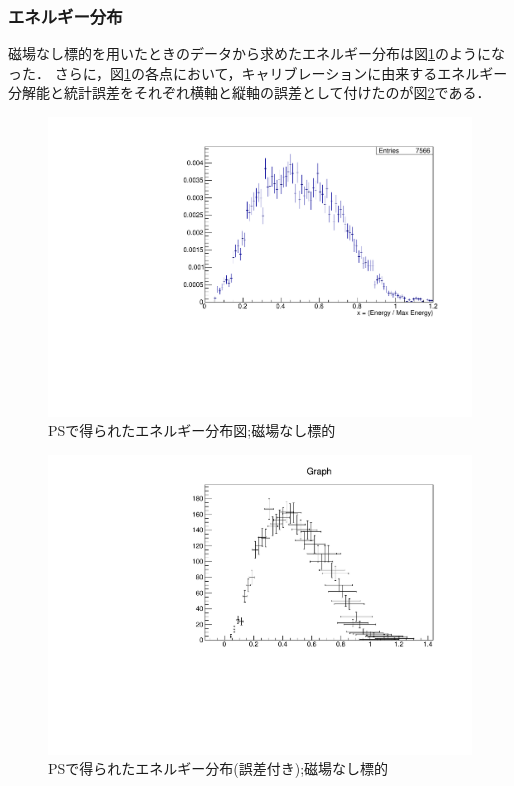 \subsubsection{エネルギー分布}
磁場なし標的を用いたときのデータから求めたエネルギー分布は図\ref{michel_PS}のようになった．
さらに，図\ref{michel_PS}の各点において，キャリブレーションに由来するエネルギー分解能と統計誤差をそれぞれ横軸と縦軸の誤差として付けたのが図\ref{michel_PS_gosa}である．
\begin{figure}[H]
\centering
\includegraphics[height = 0.7\columnwidth , angle = -90]{figure/ikemitsu/michel_PS.pdf}
\caption{PSで得られたエネルギー分布図;磁場なし標的}
\label{michel_PS}
\end{figure}

\begin{figure}[H]
\centering
\includegraphics[height = 0.7\columnwidth , angle = -90]{figure/ikemitsu/michel_PS_gosa.pdf}
\caption{PSで得られたエネルギー分布(誤差付き);磁場なし標的}
\label{michel_PS_gosa}
\end{figure}

